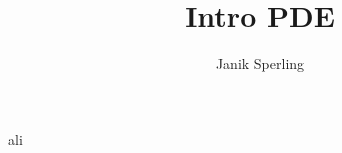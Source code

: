 \documentclass[a4paper]{report}
\title{Intro PDE}
\author{Janik Sperling}
\begin{document}

% 
ali
\end{document}
